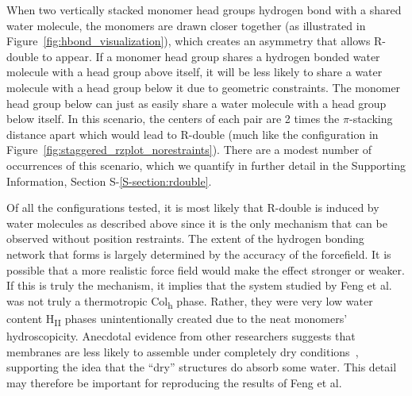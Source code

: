 \documentclass[journal=jpcbfk,manuscript=article]{achemso}
\begin{document}
  When two vertically stacked monomer head groups hydrogen bond with a shared
  water molecule, the monomers are drawn closer together (as illustrated in
  Figure~\ref{fig:hbond_visualization}), which creates an asymmetry that allows
  R-double to appear. If a monomer head group shares a hydrogen bonded water
  molecule with a head group above itself, it will be less likely to share a
  water molecule with a head group below it due to geometric constraints. The
  monomer head group below can just as easily share a water molecule with a head
  group below itself. In this scenario, the centers of each pair are 2 times the
  $\pi$-stacking distance apart which would lead to R-double (much like the
  configuration in Figure~\ref{fig:staggered_rzplot_norestraints}). There are a
  modest number of occurrences of this scenario, which we quantify in further
  detail in the Supporting Information, Section S-\ref{S-section:rdouble}.  

  
  Of all the configurations tested, it is most likely that R-double is induced
  by water molecules as described above since it is the only mechanism that can
  be observed without position restraints. The extent of the hydrogen bonding
  network that forms is largely determined by the accuracy of the forcefield. It
  is possible that a more realistic force field would make the effect stronger or
  weaker. If this is truly the mechanism, it implies that the system studied by
  Feng et al.\cite{feng_scalable_2014,feng_thin_2016} was not truly a
  thermotropic Col\textsubscript{h} phase. Rather, they were very low water
  content H\textsubscript{II} phases unintentionally created due to the neat
  monomers' hydroscopicity.  Anecdotal evidence from other researchers suggests
  that membranes are less likely to assemble under completely dry
  conditions~\cite{personal_communication_with_mike_mcgrath}, supporting the idea
  that the ``dry'' structures do absorb some water.  This detail may therefore be
  important for reproducing the results of Feng et al.
\end{document}
